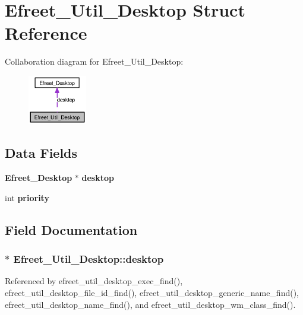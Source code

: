 \section{Efreet\_\-Util\_\-Desktop Struct Reference}
\label{structEfreet__Util__Desktop}
Collaboration diagram for Efreet\_\-Util\_\-Desktop:\nopagebreak
\begin{figure}[H]
\begin{center}
\leavevmode
\includegraphics[width=73pt]{structEfreet__Util__Desktop__coll__graph}
\end{center}
\end{figure}
\subsection*{Data Fields}
\begin{CompactItemize}
\item 
{\bf Efreet\_\-Desktop} $\ast$ {\bf desktop}
\item 
int {\bf priority}
\end{CompactItemize}


\subsection{Field Documentation}
\subsubsection{$\ast$ {\bf Efreet\_\-Util\_\-Desktop::desktop}}\label{structEfreet__Util__Desktop_c89100418cd57d747e6d1e72e7a9db47}




Referenced by efreet\_\-util\_\-desktop\_\-exec\_\-find(), efreet\_\-util\_\-desktop\_\-file\_\-id\_\-find(), efreet\_\-util\_\-desktop\_\-generic\_\-name\_\-find(), efreet\_\-util\_\-desktop\_\-name\_\-find(), and efreet\_\-util\_\-desktop\_\-wm\_\-class\_\-find().
